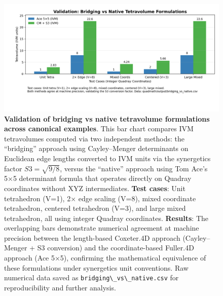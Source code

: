 \documentclass[
  10pt,
]{article}
\newcommand{\passthrough}[1]{#1}
\begin{document}
\begin{figure}
\centering
\includegraphics{../output/figures/bridging_vs_native.png}
\caption{\textbf{Validation of bridging vs native tetravolume
formulations across canonical examples}. This bar chart compares IVM
tetravolumes computed via two independent methods: the ``bridging''
approach using Cayley--Menger determinants on Euclidean edge lengths
converted to IVM units via the synergetics factor \(S3=\sqrt{9/8}\),
versus the ``native'' approach using Tom Ace's 5×5 determinant formula
that operates directly on Quadray coordinates without XYZ intermediates.
\textbf{Test cases}: Unit tetrahedron (V=1), 2× edge scaling (V=8),
mixed coordinate tetrahedron, centered tetrahedron (V=3), and large
mixed tetrahedron, all using integer Quadray coordinates.
\textbf{Results}: The overlapping bars demonstrate numerical agreement
at machine precision between the length-based Coxeter.4D approach
(Cayley--Menger + S3 conversion) and the coordinate-based Fuller.4D
approach (Ace 5×5), confirming the mathematical equivalence of these
formulations under synergetics unit conventions. Raw numerical data
saved as \passthrough{\lstinline!bridging\_vs\_native.csv!} for
reproducibility and further analysis.}
\end{figure}
\end{document}

